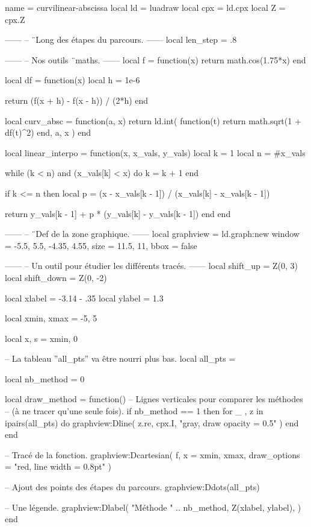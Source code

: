 \documentclass[border = 3pt]{standalone}
\begin{document}
\begin{luadraw*}{name = curvilinear-abscissa}
local ld  = luadraw
local cpx = ld.cpx
local Z   = cpx.Z

------
-- ¨Long des étapes du parcours.
------
local len_step = .8

------
-- Nos outils ¨maths.
------
local f = function(x)
  return math.cos(1.75*x)
end

local df = function(x)
  local h = 1e-6

  return (f(x + h) - f(x - h)) / (2*h)
end

local curv_absc = function(a, x)
  return ld.int(
    function(t)
      return math.sqrt(1 + df(t)^2)
    end,
    a, x
  )
end

local linear_interpo = function(x, x_vals, y_vals)
  local k = 1
  local n = #x_vals

  while (k < n) and (x_vals[k] < x) do
    k = k + 1
  end

  if k <= n then
    local p = (x - x_vals[k - 1]) / (x_vals[k] - x_vals[k - 1])

    return y_vals[k - 1] + p * (y_vals[k] - y_vals[k - 1])
  end
end

------
-- ¨Def de la zone graphique.
------
local graphview = ld.graph:new{
  window = {-5.5, 5.5, -4.35, 4.55},
  size   = {11.5, 11},
  bbox   = false
}

------
-- Un outil pour étudier les différents tracés.
------
local shift_up   = Z(0, 3)
local shift_down = Z(0, -2)

local xlabel = -3.14 - .35
local ylabel = 1.3

local xmin, xmax = -5, 5

local x, s = xmin, 0

-- La tableau ''all_pts'' va être nourri plus bas.
local all_pts = {}

local nb_method = 0

local draw_method = function()
-- Lignes verticales pour comparer les méthodes
-- (à ne tracer qu'une seule fois).
  if nb_method == 1 then
    for _ , z in ipairs(all_pts) do
      graphview:Dline(
        {z.re, cpx.I},
        "gray, draw opacity = 0.5"
      )
    end
  end

-- Tracé de la fonction.
  graphview:Dcartesian(
    f,
    {
      x = {xmin, xmax},
      draw_options = "red, line width = 0.8pt"
    }
  )

-- Ajout des points des étapes du parcours.
  graphview:Ddots(all_pts)

-- Une légende.
  graphview:Dlabel(
    "Méthode " .. nb_method,
    Z(xlabel, ylabel),
    {}
  )
end



\end{luadraw*}
\end{document}
